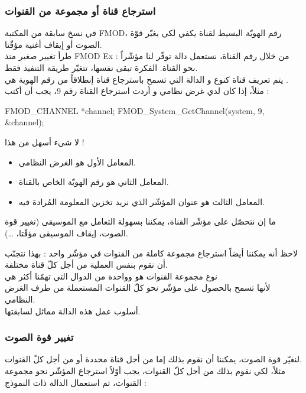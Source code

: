 \subsubsection{استرجاع قناة أو مجموعة من القنوات}

في نسخ سابقة من المكتبة
\textenglish{FMOD}،
رقم الهويّة البسيط لقناة يكفي لكي يغيّر قوّة الصوت أو إيقاف أغنية مؤقّتا.\\
طرأ تغيير صغير منذ
\textenglish{FMOD Ex} :
من خلال رقم القناة، نستعمل دالة توفّر لنا مؤشّراً نحو القناة. الفكرة تبقى نفسها، تتغيّر طريقة التنفيذ فقط.\\
يتم تعريف قناة كنوع
و الدالة التي تسمح باسترجاع قناة إنطلاقاً من رقم الهوية هي
.\\
مثلاً، إذا كان لدي غرض نظامي و أردت استرجاع القناة رقم 9، يجب أن أكتب :

\begin{Csource}
FMOD_CHANNEL *channel;
FMOD_System_GetChannel(system, 9, &channel);
\end{Csource}

لا شيء أسهل من هذا !

\begin{itemize}
	\item المعامل الأول هو الغرض النظامي.
	\item المعامل الثاني هو رقم الهويّة الخاص بالقناة.
	\item المعامل الثالث هو عنوان المؤشّر الذي نريد تخزين المعلومة المُرادة فيه.
\end{itemize}

ما إن نتحصّل على مؤشّر القناة، يمكننا بسهولة التعامل مع الموسيقى (تغيير قوة الصوت، إيقاف الموسيقى مؤقّتا، \dots).

لاحظ أنه يمكننا أيضاً استرجاع مجموعة كاملة من القنوات في مؤشّر واحد : بهذا نتجنّب أن نقوم بنفس العملية من أجل كلّ قناة مختلفة.\\
نوع مجموعة القنوات هو
وواحدة من الدوال التي تهمّنا أكثر هي\\
لأنها تسمح بالحصول على مؤشّر نحو كلّ القنوات المستعملة من طرف الغرض النظامي.\\
أسلوب عمل هذه الدالة مماثل لسابقتها.

\subsubsection{تغيير قوة الصوت}

لنغيّر قوة الصوت، يمكننا أن نقوم بذلك إما من أجل قناة محددة أو من أجل كلّ القنوات.\\
مثلاً، لكي نقوم بذلك من أجل كلّ القنوات، يجب أوّلاُ استرجاع المؤشّر نحو مجموعة القنوات، ثم استعمال الدالة
ذات النموذج :

